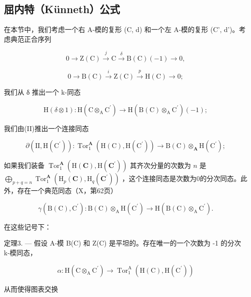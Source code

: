 \subsection{屈内特（Künneth）公式}

在本节中，我们考虑一个右 A-模的复形 (C, d) 和一个左 A-模的复形 (C', d')。考虑典范正合序列

\[
0 \rightarrow \mathrm{Z} (\mathrm{C}) \stackrel {{j}} {{\rightarrow}} \mathrm{C} \stackrel {{\delta}} {{\rightarrow}} \mathrm{B} (\mathrm{C}) (- 1) \rightarrow 0,\tag{I}
\]

\[
0 \rightarrow \mathrm{B} (\mathrm{C}) \xrightarrow {i} \mathrm{Z} (\mathrm{C}) \xrightarrow {p} \mathrm{H} (\mathrm{C}) \rightarrow 0;\tag{II}
\]

我们从 δ 推出一个 k-同态

\[
\mathrm{H} (\delta \otimes 1): \mathrm{H} (\mathrm{C} \otimes_ {\mathrm{A}} \mathrm{C} ^ {\prime}) \rightarrow \mathrm{H} (\mathrm{B} (\mathrm{C}) \otimes_ {\mathrm{A}} \mathrm{C} ^ {\prime}) (- 1);
\]

我们由(II)推出一个连接同态

\[
\partial (\mathrm{II}, \mathrm{H} (\mathrm{C} ^ {\prime})): \operatorname{Tor} _ {1} ^ {\mathbf {A}} (\mathrm{H} (\mathrm{C}), \mathrm{H} (\mathrm{C} ^ {\prime})) \rightarrow \mathrm{B} (\mathrm{C}) \otimes_ {\mathbf {A}} \mathrm{H} (\mathrm{C} ^ {\prime});
\]

如果我们装备 \(\operatorname{Tor}_{1}^{\mathbf{A}}(\mathrm{H}(\mathbf{C}),\mathrm{H}(\mathbf{C}^{\prime}))\) 其齐次分量的次数为 \(n\) 是 \(\bigoplus_{p+q=n}\operatorname{Tor}_{1}^{\mathbf{A}}(\mathrm{H}_{p}(\mathbf{C}),\mathrm{H}_{q}(\mathbf{C}^{\prime}))\) ，这个连接同态是次数为0的分次同态。此外，存在一个典范同态（X，第62页）

\[
\gamma (\mathrm{B} (\mathrm{C}), \mathrm{C} ^ {\prime}): \mathrm{B} (\mathrm{C}) \otimes_ {\mathrm{A}} \mathrm{H} (\mathrm{C} ^ {\prime}) \rightarrow \mathrm{H} (\mathrm{B} (\mathrm{C}) \otimes_ {\mathrm{A}} \mathrm{C} ^ {\prime}).
\]

在这些记号下：

定理3. --- 假设 A-模 B(C) 和 Z(C) 是平坦的。存在唯一的一个次数为 -1 的分次 k-模同态，

\[
\alpha : \mathrm{H} (\mathrm{C} \otimes_ {\mathrm{A}} \mathrm{C} ^ {\prime}) \rightarrow \operatorname{Tor} _ {1} ^ {\mathrm{A}} (\mathrm{H} (\mathrm{C}), \mathrm{H} (\mathrm{C} ^ {\prime}))
\]

从而使得图表交换

